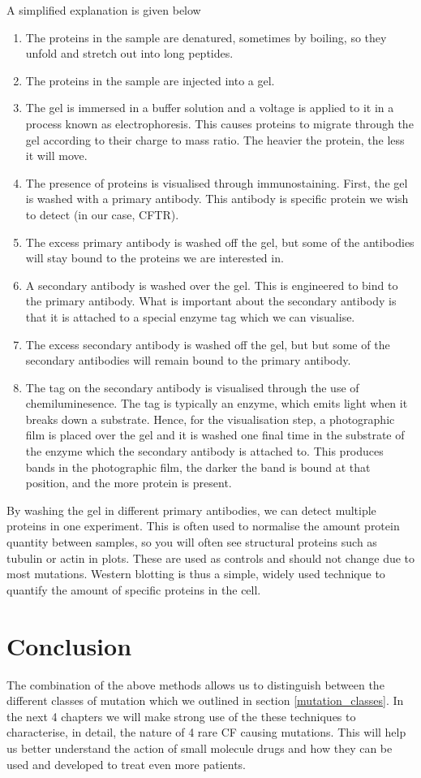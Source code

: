 A simplified explanation is given below
\begin{enumerate}
	\item The proteins in the sample are denatured, sometimes by boiling, so they unfold and stretch out into long peptides. 
	\item The proteins in the sample are injected into a gel.
	\item The gel is immersed in a buffer solution and a voltage is applied to it in a process known as electrophoresis. This causes proteins to migrate through the gel according to their charge to mass ratio. The heavier the protein, the less it will move. 
	\item The presence of proteins is visualised through immunostaining. First, the gel is washed with a primary antibody. This antibody is specific protein we wish to detect (in our case, CFTR). 
	\item The excess primary antibody is washed off the gel, but some of the antibodies will stay bound to the proteins we are interested in. 
	\item A secondary antibody is washed over the gel. This is engineered to bind to the primary antibody. What is important about the secondary antibody is that it is attached to a special enzyme tag which we can visualise.  
	\item The excess secondary antibody is washed off the gel, but but some of the secondary antibodies will remain bound to the primary antibody.
	\item The tag on the secondary antibody is visualised through the use of chemiluminesence. The tag is typically an enzyme, which emits light when it breaks down a substrate. Hence, for the visualisation step, a photographic film is placed over the gel and it is washed one final time in the substrate of the enzyme which the secondary antibody is attached to. This produces bands in the photographic film, the darker the band is bound at that position, and the more protein is present.
\end{enumerate}
By washing the gel in different  primary antibodies, we can detect multiple proteins in one experiment. This is often used to normalise the amount protein quantity between samples, so you will often see structural proteins such as tubulin or actin in plots. These are used as controls and should not change due to most mutations. Western blotting is thus a simple, widely used technique to quantify the amount of specific proteins in the cell. 

\section{Conclusion}
The combination of the above methods allows us to distinguish between the different classes of mutation which we outlined in section \ref{mutation_classes}. In the next 4 chapters we will make strong use of the these techniques to characterise, in detail, the nature of 4 rare CF causing mutations. This will help us better understand the action of small molecule drugs and how they can be used and developed to treat even more patients.
